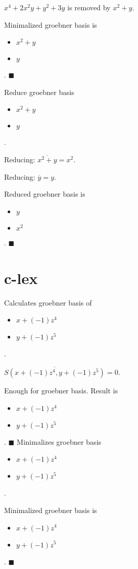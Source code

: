 \documentclass{jsarticle}
\begin{document}
$x^{4}+2x^{2}y+y^{2}+3y$ is removed by $x^{2}+y$.  

Minimalized groebner basis is 
\begin{itemize}
\item $x^{2}+y$
\item $y$
\end{itemize}  . 
$\blacksquare{}$

Reduce groebner basis 
\begin{itemize}
\item $x^{2}+y$
\item $y$
\end{itemize}  . 


Reducing: $\overline{x^{2}+y} = x^{2}$.  

Reducing: $\overline{y} = y$.  

Reduced groebner basis is 
\begin{itemize}
\item $y$
\item $x^{2}$
\end{itemize}  . 
$\blacksquare{}$

\section{c-lex}Calculates groebner basis of 
\begin{itemize}
\item $x+(-1)z^{4}$
\item $y+(-1)z^{5}$
\end{itemize}  . 


$\overline{S(x+(-1)z^{4}, y+(-1)z^{5})} = 0$.  

Enough for groebner basis.  Result is \begin{itemize}
\item $x+(-1)z^{4}$
\item $y+(-1)z^{5}$
\end{itemize}  . 
$\blacksquare{}$
Minimalizes groebner basis 
\begin{itemize}
\item $x+(-1)z^{4}$
\item $y+(-1)z^{5}$
\end{itemize}  . 


Minimalized groebner basis is 
\begin{itemize}
\item $x+(-1)z^{4}$
\item $y+(-1)z^{5}$
\end{itemize}  . 
$\blacksquare{}$
\end{document}
